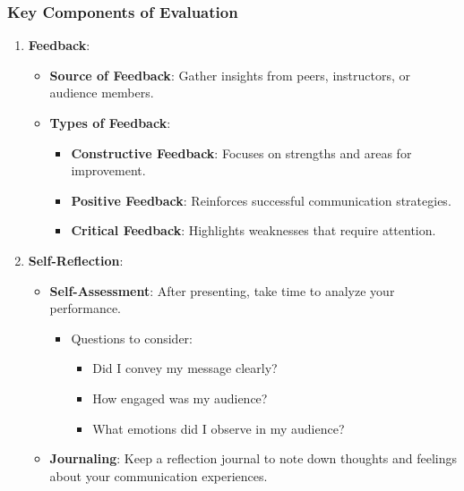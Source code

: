 \documentclass[aspectratio=169]{beamer}
\begin{document}
\begin{frame}[fragile]
    \frametitle{Key Components of Evaluation}
    \begin{enumerate}
        \item \textbf{Feedback}:
          \begin{itemize}
              \item \textbf{Source of Feedback}: Gather insights from peers, instructors, or audience members.
              \item \textbf{Types of Feedback}:
                \begin{itemize}
                    \item \textbf{Constructive Feedback}: Focuses on strengths and areas for improvement.
                    \item \textbf{Positive Feedback}: Reinforces successful communication strategies.
                    \item \textbf{Critical Feedback}: Highlights weaknesses that require attention.
                \end{itemize}
          \end{itemize}
        \item \textbf{Self-Reflection}:
          \begin{itemize}
              \item \textbf{Self-Assessment}: After presenting, take time to analyze your performance.
                  \begin{itemize}
                      \item Questions to consider:
                      \begin{itemize}
                          \item Did I convey my message clearly?
                          \item How engaged was my audience?
                          \item What emotions did I observe in my audience? 
                      \end{itemize}
                  \end{itemize}
              \item \textbf{Journaling}: Keep a reflection journal to note down thoughts and feelings about your communication experiences.
          \end{itemize}
    \end{enumerate}
\end{frame}
\end{document}
